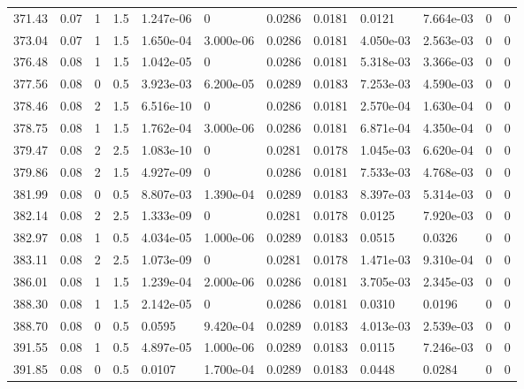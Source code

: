 \documentclass[preview]{standalone}
\begin{document}
{{{{{{\begin{tabular}{L{1.2cm}C{1.2cm} C{0.3cm}C{0.5cm} C{1.4cm}C{1.4cm} C{1.4cm}C{1.4cm} C{1.6cm}C{1.6cm} C{1.6cm}C{1.6cm}}
  371.43  &  0.07  & 1     & 1.5 &  1.247e-06  & 0  &  0.0286&   0.0181& 0.0121 & 7.664e-03   &  0 & 0  \\ 
  373.04  &  0.07  & 1     & 1.5 &  1.650e-04  & 3.000e-06  &  0.0286&   0.0181& 4.050e-03 & 2.563e-03   &  0 & 0  \\ 
  376.48  &  0.08  & 1     & 1.5 &  1.042e-05  & 0  &  0.0286&   0.0181& 5.318e-03 & 3.366e-03   &  0 & 0  \\ 
  377.56  &  0.08  & 0     & 0.5 &  3.923e-03  & 6.200e-05  &  0.0289&   0.0183& 7.253e-03 & 4.590e-03   &  0 & 0  \\ 
  378.46  &  0.08  & 2     & 1.5 &  6.516e-10  & 0  &  0.0286&   0.0181& 2.570e-04 & 1.630e-04   &  0 & 0  \\ 
  378.75  &  0.08  & 1     & 1.5 &  1.762e-04  & 3.000e-06  &  0.0286&   0.0181& 6.871e-04 & 4.350e-04   &  0 & 0  \\ 
  379.47  &  0.08  & 2     & 2.5 &  1.083e-10  & 0  &  0.0281&   0.0178& 1.045e-03 & 6.620e-04   &  0 & 0  \\ 
  379.86  &  0.08  & 2     & 1.5 &  4.927e-09  & 0  &  0.0286&   0.0181& 7.533e-03 & 4.768e-03   &  0 & 0  \\ 
  381.99  &  0.08  & 0     & 0.5 &  8.807e-03  & 1.390e-04  &  0.0289&   0.0183& 8.397e-03 & 5.314e-03   &  0 & 0  \\ 
  382.14  &  0.08  & 2     & 2.5 &  1.333e-09  & 0  &  0.0281&   0.0178& 0.0125 & 7.920e-03   &  0 & 0  \\ 
  382.97  &  0.08  & 1     & 0.5 &  4.034e-05  & 1.000e-06  &  0.0289&   0.0183& 0.0515 & 0.0326   &  0 & 0  \\ 
  383.11  &  0.08  & 2     & 2.5 &  1.073e-09  & 0  &  0.0281&   0.0178& 1.471e-03 & 9.310e-04   &  0 & 0  \\ 
  386.01  &  0.08  & 1     & 1.5 &  1.239e-04  & 2.000e-06  &  0.0286&   0.0181& 3.705e-03 & 2.345e-03   &  0 & 0  \\ 
  388.30  &  0.08  & 1     & 1.5 &  2.142e-05  & 0  &  0.0286&   0.0181& 0.0310 & 0.0196   &  0 & 0  \\ 
  388.70  &  0.08  & 0     & 0.5 &  0.0595  & 9.420e-04  &  0.0289&   0.0183& 4.013e-03 & 2.539e-03   &  0 & 0  \\ 
  391.55  &  0.08  & 1     & 0.5 &  4.897e-05  & 1.000e-06  &  0.0289&   0.0183& 0.0115 & 7.246e-03   &  0 & 0  \\ 
  391.85  &  0.08  & 0     & 0.5 &  0.0107  & 1.700e-04  &  0.0289&   0.0183& 0.0448 & 0.0284   &  0 & 0  \\ 

\end{tabular}}}}}}}
\end{document}
